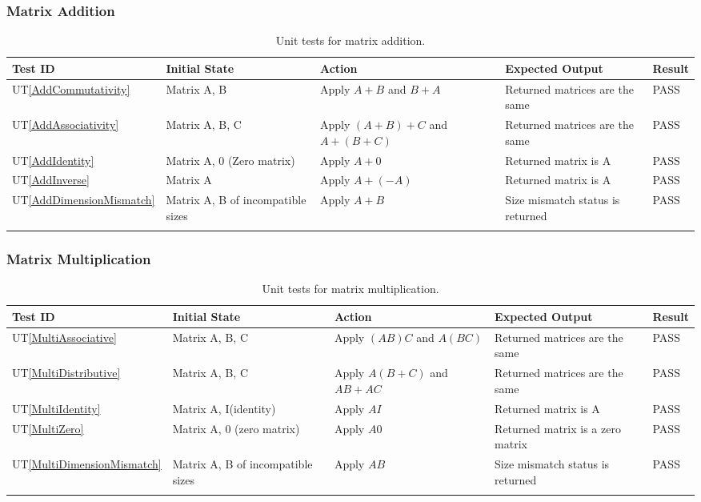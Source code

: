 \documentclass[12pt, titlepage]{article}
\newcommand{\utref}[1]{UT\ref{#1}}
\begin{document}
\subsubsection{Matrix Addition}
{\footnotesize
\begin{longtable}{|p{0.8cm}|p{3.5cm}|p{3.5cm}|p{3.5cm}|p{1cm}|}
    \hline
    \textbf{Test ID} & \textbf{Initial State} & \textbf{Action} &
    \textbf{Expected Output} & \textbf{Result} \\ 
    \endfirsthead
    \hline
    
    \utref{AddCommutativity} & Matrix A, B & Apply $A + B$ and $B + A$ &
    Returned matrices are the same & PASS\\ \hline
    \utref{AddAssociativity} & Matrix A, B, C & Apply $(A + B) + C$ and $A + (B
    + C)$ & Returned matrices are the same & PASS\\ \hline
    \utref{AddIdentity} & Matrix A, 0 (Zero matrix) & Apply $A + 0$ & Returned
    matrix is A & PASS\\ \hline
    \utref{AddInverse} & Matrix A & Apply $A + (-A)$ & Returned matrix is A &
    PASS\\ \hline
    \utref{AddDimensionMismatch} & Matrix A, B of incompatible sizes & Apply $A
    + B$ & Size mismatch status is returned & PASS\\ \hline

    \caption{Unit tests for matrix addition.}
    \label{tab:unit_test_matrix_add}
\end{longtable}
}

\subsubsection{Matrix Multiplication}
{\footnotesize
\begin{longtable}{|p{0.8cm}|p{3.5cm}|p{3.5cm}|p{3.5cm}|p{1cm}|}
    \hline
    \textbf{Test ID} & \textbf{Initial State} & \textbf{Action} &
    \textbf{Expected Output} & \textbf{Result} \\ 
    \endfirsthead
    \hline
    
    \utref{MultiAssociative} & Matrix A, B, C & Apply $(AB)C$ and $A(BC)$ &
    Returned matrices are the same & PASS\\ \hline
    \utref{MultiDistributive} & Matrix A, B, C & Apply $A(B + C)$ and $AB + AC$
    & Returned matrices are the same & PASS\\ \hline
    \utref{MultiIdentity} & Matrix A, I(identity) & Apply $AI$ & Returned matrix
    is A & PASS\\ \hline
    \utref{MultiZero} & Matrix A, 0 (zero matrix) & Apply $A0$ & Returned matrix
    is a zero matrix & PASS\\ \hline
    \utref{MultiDimensionMismatch} & Matrix A, B of incompatible sizes & Apply
    $AB$ & Size mismatch status is returned & PASS\\ \hline

    \caption{Unit tests for matrix multiplication.}
    \label{tab:unit_test_matrix_multi}
\end{longtable}
}
\end{document}

